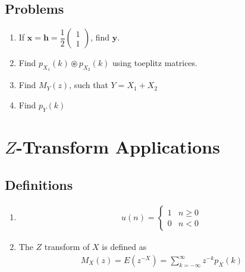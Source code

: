 \documentclass[journal,12pt,onecolumn]{IEEEtran}
\renewcommand\thesection{\arabic{section}}
\renewcommand\thesubsection{\thesection.\arabic{subsection}}
\providecommand{\brak}[1]{\ensuremath{\left(#1\right)}}
\theoremstyle{remark}
\newcommand{\myvec}[1]{\ensuremath{\begin{pmatrix}#1\end{pmatrix}}}
\numberwithin{equation}{section}
\let\vec\mathbf
\begin{document}
\subsection{Problems}
\begin{enumerate}[label=\arabic*.,ref=\thesubsection.\theenumi]
\item If $\vec{x} = \vec{h}= \dfrac{1}{2}\myvec{1\\1}$, find $\vec{y}$.
\item Find $p_{X_1}(k) \circledast p_{X_2}(k)$ using toeplitz matrices.
\item Find $M_Y(z)$, such that $Y =X_1 + X_2$
\item Find $p_Y(k)$			
\end{enumerate}
		\section{$Z$-Transform Applications}
\subsection{Definitions}
\begin{enumerate}[label=\arabic*.,ref=\thesubsection.\theenumi]
\item 
	\begin{align}
u(n) =
\begin{cases}
1 & n \ge 0
\\
0 & n < 0
\end{cases}
\end{align}

\item The $Z$ transform of $X$ is defined as 
	\begin{align}
	M_X(z)=E\brak{z^{-X}} = \sum_{k = -\infty}^{\infty}z^{-k}p_X(k)
	\end{align}
\end{enumerate}
\end{document}
